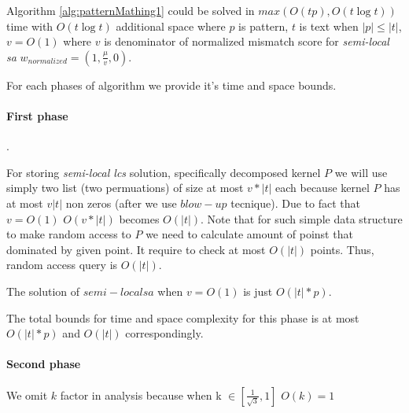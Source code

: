 \begin{theorem}
Algorithm \ref{alg:patternMathing1} could  be solved in
 $max(O(tp),O(t \log t))$  time with $O(t \log t)$ additional space where $p$ is pattern, $t$ is text when $|p| \leq |t|$, $v=O(1)$ where $v$ is denominator of normalized mismatch score for \emph{semi-local sa}
$w_{normalized} = (1,\frac{\mu}{v},0)$.
\end{theorem}

For each phases of algorithm we provide it's time and space bounds.

\paragraph{First phase}.

For storing \emph{semi-local lcs} solution, specifically decomposed kernel $P$ we will use simply two list (two permuations) of size at most $v*|t|$ each because kernel $P$ has at most $v|t|$ non zeros (after we use $blow-up$ tecnique).
Due to fact that $v = O(1)$    $O(v*|t|)$ becomes $O(|t|)$.
Note that for such simple data structure to make random access to $P$ we need to calculate amount of poinst that dominated by given point. It require to check at most   $O(|t|)$ points. 
Thus, random access query is $O(|t|)$.

The solution of $semi-local sa$ when $v=O(1)$ is just $O(|t|*p)$.

The total bounds for time and space complexity for this phase is at most $O(|t|*p)$ and $O(|t|)$ correspondingly.

\paragraph{Second phase}
We omit $k$ factor in analysis because when k $\in [\frac{1}{\sqrt{3}},1]$ $O(k) = 1$


